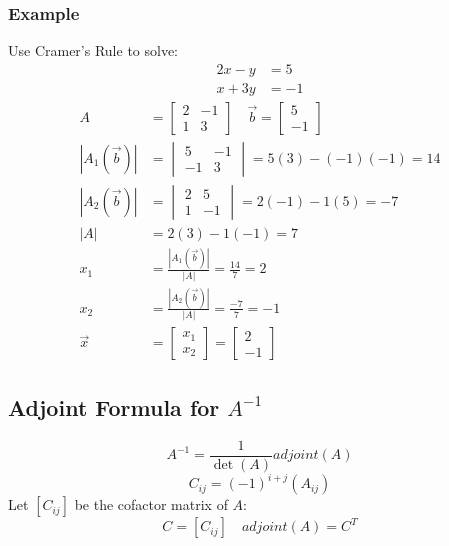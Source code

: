 \documentclass{math}
\begin{document}
\subsubsection*{Example}
Use Cramer's Rule to solve:
\begin{align*}
  2x-y &= 5 \\
  x+3y &= -1
\end{align*}
\begin{align*}
  A &= \begin{bmatrix}
    2 & -1 \\
    1 & 3
  \end{bmatrix} \quad \vec{b} = \begin{bmatrix}5 \\ -1\end{bmatrix} \\
  |A_1(\vec{b})| &= \begin{vmatrix}
    5 & -1 \\
    -1 & 3
  \end{vmatrix} = 5(3)-(-1)(-1) = 14 \\
  |A_2(\vec{b})| &= \begin{vmatrix}
    2 & 5 \\
    1 & -1
  \end{vmatrix} = 2(-1)-1(5) = -7 \\
  |A| &= 2(3)-1(-1) = 7 \\
  x_1 &= \frac{|A_1(\vec{b})|}{|A|} = \frac{14}{7} = 2 \\
  x_2 &= \frac{|A_2(\vec{b})|}{|A|} = \frac{-7}{7} = -1 \\
  \vec{x} &= \begin{bmatrix}x_1 \\ x_2\end{bmatrix} = \begin{bmatrix}
    2 \\ -1
  \end{bmatrix}
\end{align*}

\subsection*{Adjoint Formula for \( A^{-1} \)}
\[ A^{-1} = \frac{1}{\det(A)}adjoint(A) \]
\[ C_{ij} = (-1)^{i+j}(A_{ij}) \]
Let \( [C_{ij}] \) be the cofactor matrix of \( A \):
\[ C = [C_{ij}] \quad adjoint(A) = C^T \]
\end{document}
